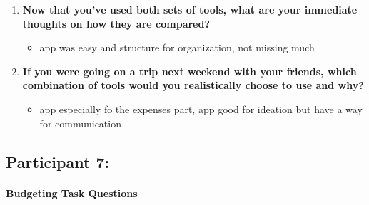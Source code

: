 \documentclass[12pt,a4paper]{article}
\begin{document}
\begin{enumerate}
    \item \textbf{Now that you've used both sets of tools, what are your immediate thoughts on how they are compared?}
    
    \begin{itemize}
        \item app was easy and structure for organization, not missing much
    \end{itemize}
    
    \item \textbf{If you were going on a trip next weekend with your friends, which combination of tools would you realistically choose to use and why?}
    
    \begin{itemize}
        \item app especially fo the expenses part, app good for ideation but have a way for communication
    \end{itemize}
\end{enumerate}

\subsection{Participant 7:}
\paragraph{Budgeting Task Questions}
\end{document}
